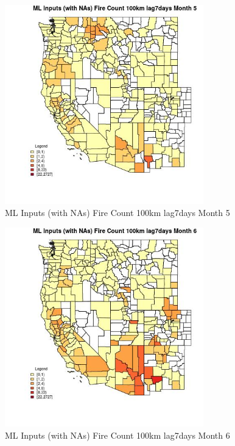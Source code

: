 \begin{figure} 
\centering  
\includegraphics[width=0.77\textwidth]{Code_Outputs/Report_ML_input_PM25_Step4_part_f_de_duplicated_aves_prioritize_24hr_obswNAs_CountyFire_Count_100km_lag7daysmedianMonth5.jpg} 
\caption{\label{fig:Report_ML_input_PM25_Step4_part_f_de_duplicated_aves_prioritize_24hr_obswNAsCountyFire_Count_100km_lag7daysmedianMonth5}ML Inputs (with NAs) Fire Count 100km lag7days Month 5} 
\end{figure} 
 

\begin{figure} 
\centering  
\includegraphics[width=0.77\textwidth]{Code_Outputs/Report_ML_input_PM25_Step4_part_f_de_duplicated_aves_prioritize_24hr_obswNAs_CountyFire_Count_100km_lag7daysmedianMonth6.jpg} 
\caption{\label{fig:Report_ML_input_PM25_Step4_part_f_de_duplicated_aves_prioritize_24hr_obswNAsCountyFire_Count_100km_lag7daysmedianMonth6}ML Inputs (with NAs) Fire Count 100km lag7days Month 6} 
\end{figure} 
 

